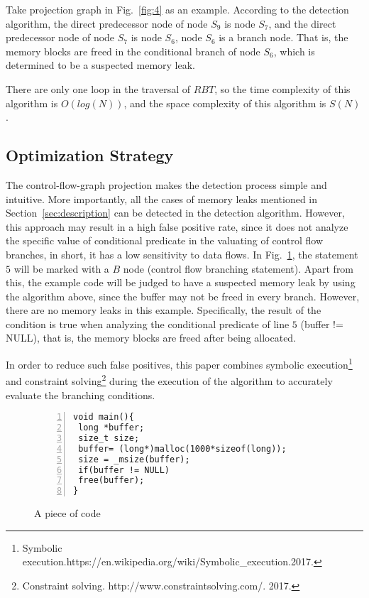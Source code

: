 Take projection graph in Fig.~\ref{fig:4} as an example. According to the detection algorithm, the direct predecessor node of node $S_9$ is node $S_7$, and the direct predecessor node of node $S_7$ is node $S_6$, node $S_6$ is a branch node. That is, the memory blocks are freed in the conditional branch of node $S_6$, which is determined to be a suspected memory leak.

There are only one loop in the traversal of $RBT$, so the time complexity of this algorithm is $O(log(N))$, and the space complexity of this algorithm is $S(N)$.

\subsection{Optimization Strategy}

The control-flow-graph projection makes the detection process simple and intuitive. More importantly, all the cases of memory leaks mentioned in Section~\ref{sec:description} can be detected in the detection algorithm. However, this approach may result in a high false positive rate, since it does not analyze the specific value of conditional predicate in the valuating of control flow branches, in short, it has a low sensitivity to data flows. In Fig.~\ref{fig:7}, the statement $5$ will be marked with a $B$ node (control flow branching statement). Apart from this, the example code will be judged to have a suspected memory leak by using the algorithm above, since the buffer may not be freed in every branch. However, there are no memory leaks in this example. Specifically, the result of the condition is true when analyzing the conditional predicate of line $5$ (buffer != NULL), that is, the memory blocks are freed after being allocated. 

In order to reduce such false positives, this paper combines symbolic execution\footnote{Symbolic execution.https://en.wikipedia.org/wiki/Symbolic\_execution.2017.} and constraint solving\footnote{Constraint solving. http://www.constraintsolving.com/. 2017.} during the execution of the algorithm to accurately evaluate the branching conditions.
%
\begin{figure}[!h]
\small
\center
\begin{lstlisting}[frame=single,framexrightmargin=-10pt,numbers=left] 
void main(){
 long *buffer;
 size_t size;
 buffer= (long*)malloc(1000*sizeof(long));
 size = _msize(buffer);
 if(buffer != NULL)
 free(buffer);
}
\end{lstlisting}
\caption{A piece of code}\label{fig:7}
\end{figure}


